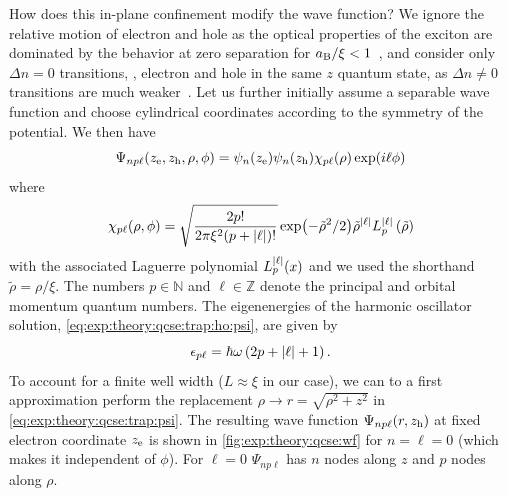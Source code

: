 How does this in-plane confinement modify the wave function?
We ignore the relative motion of electron and hole as the optical properties of the exciton are dominated by the behavior at zero separation for $a_{\mathrm{B}}/\xi < 1$~\cite{Kavokin1994}, and consider only $\Delta n = 0$ transitions, \ie, electron and hole in the same $z$ quantum state, as $\Delta n\neq 0$ transitions are much weaker~\cite{Davies2009}.
Let us further initially assume a separable wave function and choose cylindrical coordinates according to the symmetry of the potential.
We then have
\begin{equation}\label{eq:exp:theory:qcse:trap:psi}
    \Psi_{np\ell}(z_{\mathrm{e}}, z_{\mathrm{h}}, \rho, \phi) = \psi_n(z_{\mathrm{e}})\psi_n(z_{\mathrm{h}})\chi_{p\ell}(\rho)\exp(i\ell\phi)
\end{equation}
where~\cite{Karimi2014}
\begin{equation}\label{eq:exp:theory:qcse:trap:ho:psi}
    \chi_{p\ell}(\rho, \phi) = \sqrt{\frac{2p!}{2\pi\xi^2(p + \abs{\ell})!}}\exp(-\tilde{\rho}^2/2)\tilde{\rho}^{\abs{\ell}}L_p^{\abs{\ell}}\left(\tilde{\rho}\right)
\end{equation}
with the associated Laguerre polynomial $L_p^{\abs{\ell}}(x)$ and we used the shorthand $\tilde{\rho} = \rho/\xi$.
The numbers $p\in\mathbb{N}$ and $\ell\in\mathbb{Z}$ denote the principal and orbital momentum quantum numbers.
The eigenenergies of the harmonic oscillator solution, \cref{eq:exp:theory:qcse:trap:ho:psi}, are given by
\begin{equation}\label{eq:exp:theory:qcse:trap:ho:eps}
    \epsilon_{p\ell} = \hbar\omega\left(2p + \abs{\ell} + 1\right).
\end{equation}
To account for a finite well width ($L\approx\xi$ in our case), we can to a first approximation perform the replacement $\rho\to r = \sqrt{\rho^2 + z^2}$ in \cref{eq:exp:theory:qcse:trap:psi}.
The resulting wave function $\Psi_{np\ell}(r, z_{\mathrm{h}})$ at fixed electron coordinate $z_{\mathrm{e}}$ is shown in \cref{fig:exp:theory:qcse:wf} for $n = \ell = 0$ (which makes it independent of $\phi$).
For $\ell=0$ $\Psi_{np\ell}$ has $n$ nodes along $z$ and $p$ nodes along $\rho$.


